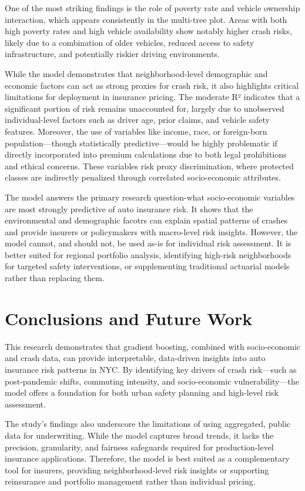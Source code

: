 \documentclass[
  number,
  review,
  3p]{elsarticle}
\begin{document}
One of the most striking findings is the role of poverty rate and
vehicle ownership interaction, which appears consistently in the
multi-tree plot. Areas with both high poverty rates and high vehicle
availability show notably higher crash risks, likely due to a
combination of older vehicles, reduced access to safety infrastructure,
and potentially riskier driving environments.

While the model demonstrates that neighborhood-level demographic and
economic factors can act as strong proxies for crash risk, it also
highlights critical limitations for deployment in insurance pricing. The
moderate R² indicates that a significant portion of risk remains
unaccounted for, largely due to unobserved individual-level factors such
as driver age, prior claims, and vehicle safety features. Moreover, the
use of variables like income, race, or foreign-born population---though
statistically predictive---would be highly problematic if directly
incorporated into premium calculations due to both legal prohibitions
and ethical concerns. These variables risk proxy discrimination, where
protected classes are indirectly penalized through correlated
socio-economic attributes.

The model answers the primary research question-what socio-economic
variables are most strongly predictive of auto insurance risk. It shows
that the environmental and demographic facotrs can explain spatial
patterns of crashes and provide insurers or policymakers with
macro-level risk insights. However, the model cannot, and should not, be
used as-is for individual risk assessment. It is better suited for
regional portfolio analysis, identifying high-risk neighborhoods for
targeted safety interventions, or supplementing traditional actuarial
models rather than replacing them.

\section{Conclusions and Future Work}\label{conclusions-and-future-work}

This research demonstrates that gradient boosting, combined with
socio-economic and crash data, can provide interpretable, data-driven
insights into auto insurance risk patterns in NYC. By identifying key
drivers of crash risk---such as post-pandemic shifts, commuting
intensity, and socio-economic vulnerability---the model offers a
foundation for both urban safety planning and high-level risk
assessment.

The study's findings also underscore the limitations of using
aggregated, public data for underwriting. While the model captures broad
trends, it lacks the precision, granularity, and fairness safeguards
required for production-level insurance applications. Therefore, the
model is best suited as a complementary tool for insurers, providing
neighborhood-level risk insights or supporting reinsurance and portfolio
management rather than individual pricing.
\end{document}
